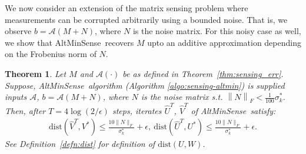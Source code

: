 \documentclass[11pt]{article}
\theoremstyle{plain}
\newtheorem{theorem}{Theorem}[section]
\theoremstyle{definition}
\newcommand{\rmn}{\mathbb{R}^{m \times n}}
\newcommand{\dist}{\mathrm{dist}}
\newcommand{\calA}{\mathcal{A}}
\newcommand{\aff}{{\mathcal A}}
\newcommand{\Un}{U^N}
\newcommand{\Vn}{V^N}
\newcommand{\Sn}{\Sigma^N}
\newcommand{\sn}{\sigma^N}
\newcommand{\so}{\sigma^*}
\newcommand{\as}{AltMinSense\ }
\newcommand{\Vw}{\widehat{V}}
\newcommand{\Uw}{\widehat{U}}
\begin{document}
\label{sec:sensing_noisycase}
We now consider an extension of the matrix sensing problem where measurements can be corrupted arbitrarily using a bounded noise. That is, we 
observe $b=\aff\left(M+N\right)$, where $N$ is the noise matrix. %
For this noisy case as well, we show that \as recovers $M$ upto an additive approximation depending on the Frobenius norm of  $N$. 
\begin{theorem}\label{thm:sensing-noisycase}
 Let $M$ and $\calA(\cdot)$ be as defined in Theorem~\ref{thm:sensing_err}. Suppose, \as algorithm (Algorithm \ref{algo:sensing-altmin}) is supplied inputs $\aff$, $b=\aff(M+N)$, where $N$ is the noise matrix s.t. $\left\|N\right\|_F  < \frac{1}{100}\so_k$.  Then, after $T=4\log(2/\epsilon)$ steps, iterates $\widehat{U}^{T}$, $\widehat{V}^{T}$ of \as  satisfy: 
\begin{align*}
  \dist\left(\Vw^{T},V^*\right) \leq \frac{10\|N\|_F}{\so_k} + \epsilon, \ 
  \dist\left(\Uw^{T},U^*\right) \leq \frac{10\|N\|_F}{\so_k} + \epsilon.
\end{align*}
See Definition~\ref{defn:dist} for definition of $\dist\left(U, W\right)$. 
\end{theorem}
\end{document}
